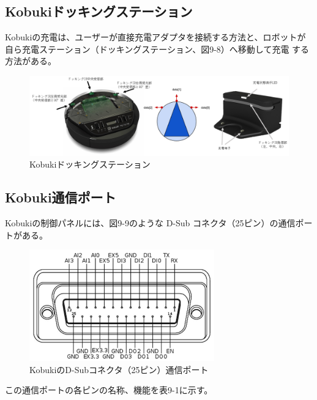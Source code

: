 \subsection{Kobukiドッキングステーション}

Kobukiの充電は、ユーザーが直接充電アダプタを接続する方法と、ロボットが自ら充電ステーション（ドッキングステーション、図9-8）へ移動して充電  する方法がある。

\begin{figure}[htp]
  \centering
  \includegraphics[width=12cm]{pictures/chapter9/pic_09_08.png}
  \caption{Kobukiドッキングステーション}
\end{figure}

\subsection{Kobuki通信ポート}

Kobukiの制御パネルには、図9-9のような D-Sub コネクタ（25ピン）の通信ポートがある。

\begin{figure}[htp]
  \centering
  \includegraphics[width=8cm]{pictures/chapter9/pic_09_09.png}
  \caption{KobukiのD-Subコネクタ（25ピン）通信ポート}
\end{figure}

この通信ポートの各ピンの名称、機能を表9-1に示す。

